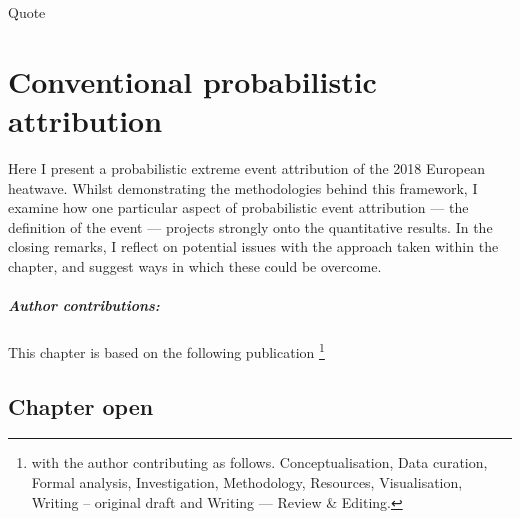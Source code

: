 \begin{savequote}[8cm]
    Quote
\end{savequote}
    
\chapter{\label{ch2}Conventional probabilistic attribution} 

Here I present a probabilistic extreme event attribution of the 2018 European heatwave. Whilst demonstrating the methodologies behind this framework, I examine how one particular aspect of probabilistic event attribution --- the definition of the event --- projects strongly onto the quantitative results. In the closing remarks, I reflect on potential issues with the approach taken within the chapter, and suggest ways in which these could be overcome.
\small\paragraph{Author contributions:} This chapter is based on the following publication \footnote{with the author contributing as follows. Conceptualisation, Data curation, Formal analysis, Investigation, Methodology, Resources, Visualisation, Writing -- original draft and Writing --- Review \& Editing.} \par\vspace{1em}

\clearpage

\minitoc

\clearpage

\section{Chapter open}

